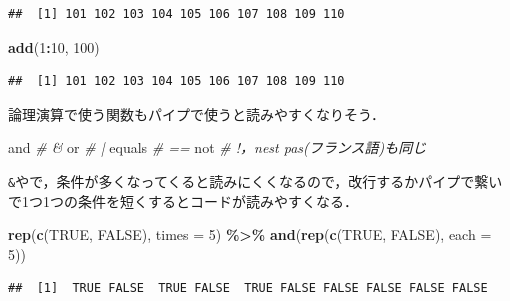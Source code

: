 \documentclass[
]{article}
\newenvironment{Shaded}{\begin{snugshade}}{\end{snugshade}}
\newcommand{\AttributeTok}[1]{\textcolor[rgb]{0.13,0.29,0.53}{#1}}
\newcommand{\CommentTok}[1]{\textcolor[rgb]{0.56,0.35,0.01}{\textit{#1}}}
\newcommand{\ConstantTok}[1]{\textcolor[rgb]{0.56,0.35,0.01}{#1}}
\newcommand{\DecValTok}[1]{\textcolor[rgb]{0.00,0.00,0.81}{#1}}
\newcommand{\FunctionTok}[1]{\textcolor[rgb]{0.13,0.29,0.53}{\textbf{#1}}}
\newcommand{\NormalTok}[1]{#1}
\newcommand{\SpecialCharTok}[1]{\textcolor[rgb]{0.81,0.36,0.00}{\textbf{#1}}}
\begin{document}
\begin{verbatim}
##  [1] 101 102 103 104 105 106 107 108 109 110
\end{verbatim}

\begin{Shaded}
\begin{Highlighting}[]
\FunctionTok{add}\NormalTok{(}\DecValTok{1}\SpecialCharTok{:}\DecValTok{10}\NormalTok{, }\DecValTok{100}\NormalTok{)}
\end{Highlighting}
\end{Shaded}

\begin{verbatim}
##  [1] 101 102 103 104 105 106 107 108 109 110
\end{verbatim}

論理演算で使う関数もパイプで使うと読みやすくなりそう．

\begin{Shaded}
\begin{Highlighting}[]
\NormalTok{and          }\CommentTok{\# \textasciigrave{}\&\textasciigrave{}}
\NormalTok{or           }\CommentTok{\# \textasciigrave{}|\textasciigrave{}}
\NormalTok{equals       }\CommentTok{\# \textasciigrave{}==\textasciigrave{}}
\NormalTok{not          }\CommentTok{\# \textasciigrave{}!\textasciigrave{}，\textasciigrave{}n\textquotesingle{}est pas\textasciigrave{}(フランス語)も同じ}
\end{Highlighting}
\end{Shaded}

\texttt{\&}や\texttt{\textbar{}}で，条件が多くなってくると読みにくくなるので，改行するかパイプで繋いで1つ1つの条件を短くするとコードが読みやすくなる．

\begin{Shaded}
\begin{Highlighting}[]
\FunctionTok{rep}\NormalTok{(}\FunctionTok{c}\NormalTok{(}\ConstantTok{TRUE}\NormalTok{, }\ConstantTok{FALSE}\NormalTok{), }\AttributeTok{times =} \DecValTok{5}\NormalTok{) }\SpecialCharTok{\%\textgreater{}\%}
  \FunctionTok{and}\NormalTok{(}\FunctionTok{rep}\NormalTok{(}\FunctionTok{c}\NormalTok{(}\ConstantTok{TRUE}\NormalTok{, }\ConstantTok{FALSE}\NormalTok{), }\AttributeTok{each =} \DecValTok{5}\NormalTok{))}
\end{Highlighting}
\end{Shaded}

\begin{verbatim}
##  [1]  TRUE FALSE  TRUE FALSE  TRUE FALSE FALSE FALSE FALSE FALSE
\end{verbatim}
\end{document}
